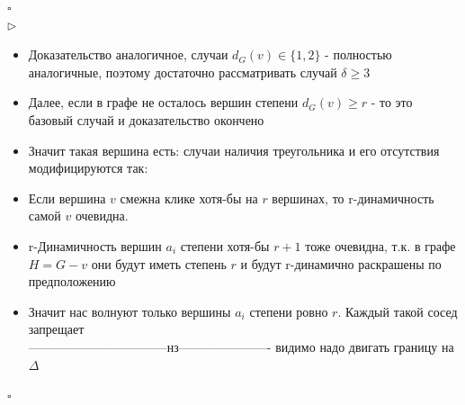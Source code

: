 \documentclass[12pt,a4paper]{article}
\theoremstyle{plain} %
\theoremstyle{definition} %
\theoremstyle{remark} %
\begin{document}
	\hfill $\square$\\
	$\triangleright$
	\begin{itemize}
		\item Доказательство аналогичное, случаи $d_G(v) \in \{1, 2\}$ - полностью аналогичные, поэтому достаточно рассматривать случай $\delta \geq 3$
		\item Далее, если в графе не осталось вершин степени $d_G(v) \geq r$ - то это базовый случай и доказательство окончено
		\item Значит такая вершина есть: случаи наличия треугольника и его отсутствия модифицируются так:
		\item Если вершина $v$ смежна клике хотя-бы на $r$ вершинах, то r-динамичность самой $v$ очевидна. 
		\item r-Динамичность вершин $a_i$ степени хотя-бы $r+1$ тоже очевидна, т.к. в графе $H = G-v$ они будут иметь степень $r$ и будут r-динамично раскрашены по предположению
		\item Значит нас волнуют только вершины $a_i$ степени ровно $r$. Каждый такой сосед запрещает\\
		---------------------------------нз----------------------
		видимо надо двигать границу на $\Delta$
	\end{itemize}
	\hfill $\square$\\
\end{document}
